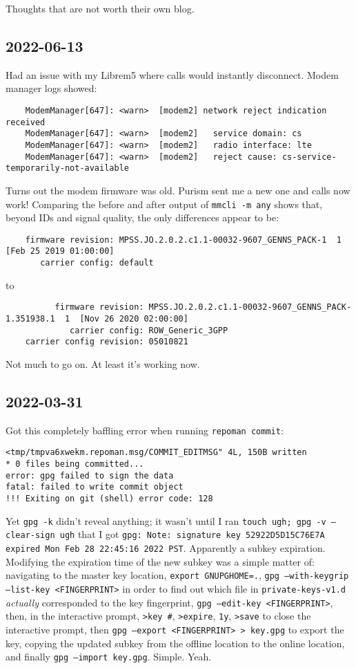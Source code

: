 \documentclass{article}
\begin{document}
Thoughts that are not worth their own blog.

\subsection{2022-06-13}
Had an issue with my Librem5 where calls would instantly disconnect.  Modem manager logs showed:
\begin{verbatim}
	ModemManager[647]: <warn>  [modem2] network reject indication received
	ModemManager[647]: <warn>  [modem2]   service domain: cs
	ModemManager[647]: <warn>  [modem2]   radio interface: lte
	ModemManager[647]: <warn>  [modem2]   reject cause: cs-service-temporarily-not-available
\end{verbatim}
Turns out the modem firmware was old.  Purism sent me a new one and calls now work!  Comparing the before and after output of \texttt{mmcli -m any} shows that, beyond IDs and signal quality, the only differences appear to be:
\begin{verbatim}
	firmware revision: MPSS.JO.2.0.2.c1.1-00032-9607_GENNS_PACK-1  1  [Feb 25 2019 01:00:00]
	   carrier config: default
\end{verbatim}
to
\begin{verbatim}
	      firmware revision: MPSS.JO.2.0.2.c1.1-00032-9607_GENNS_PACK-1.351938.1  1  [Nov 26 2020 02:00:00]
	         carrier config: ROW_Generic_3GPP
	carrier config revision: 05010821
\end{verbatim}
Not much to go on.  At least it's working now.

\subsection{2022-03-31}
Got this completely baffling error when running \texttt{repoman commit}:
\begin{verbatim}
<tmp/tmpva6xwekm.repoman.msg/COMMIT_EDITMSG" 4L, 150B written
* 0 files being committed...
error: gpg failed to sign the data
fatal: failed to write commit object
!!! Exiting on git (shell) error code: 128
\end{verbatim}
Yet \texttt{gpg -k} didn't reveal anything; it wasn't until I ran \texttt{touch ugh; gpg -v --clear-sign ugh} that I got \texttt{gpg: Note: signature key 52922D5D15C76E7A expired Mon Feb 28 22:45:16 2022 PST}.  Apparently a subkey expiration.  Modifying the expiration time of the new subkey was a simple matter of: navigating to the master key location, \texttt{export GNUPGHOME=.}, \texttt{gpg --with-keygrip --list-key <FINGERPRINT>} in order to find out which file in \texttt{private-keys-v1.d} \emph{actually} corresponded to the key fingerprint, \texttt{gpg --edit-key <FINGERPRINT>}, then, in the interactive prompt, \texttt{>key #}, \texttt{>expire}, \texttt{1y}, \texttt{>save} to close the interactive prompt, then \texttt{gpg --export <FINGERPRINT> > key.gpg} to export the key, copying the updated subkey from the offline location to the online location, and finally \texttt{gpg --import key.gpg}.  Simple.  Yeah.
\end{document}

